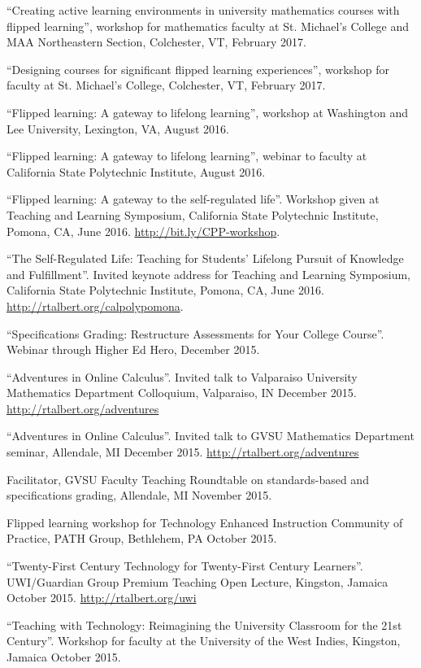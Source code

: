 \documentclass[letterpaper]{article}
\renewenvironment{itemize}{
  \begin{list}{}{
    \setlength{\leftmargin}{1.5em}
	\setlength{\itemsep}{0in}
  }
}{
  \end{list}
}
\begin{document}
\begin{itemize}
  \item ``Creating active learning environments in university mathematics courses with flipped learning'', workshop for mathematics faculty at St. Michael's College and MAA Northeastern Section, Colchester, VT, February 2017.
  \item ``Designing courses for significant flipped learning experiences'', workshop for faculty at St. Michael's College, Colchester, VT, February 2017.
  	\item ``Flipped learning: A gateway to lifelong learning'', workshop at Washington and Lee University, Lexington, VA, August 2016.
	\item ``Flipped learning: A gateway to lifelong learning'', webinar to faculty at California State Polytechnic Institute, August 2016.
	\item ``Flipped learning: A gateway to the self-regulated life''. Workshop given at Teaching and Learning Symposium, California State Polytechnic Institute, Pomona, CA, June 2016. \url{http://bit.ly/CPP-workshop}.
	\item ``The Self-Regulated Life: Teaching for Students' Lifelong Pursuit of Knowledge and Fulfillment''. Invited keynote address for Teaching and Learning Symposium, California State Polytechnic Institute, Pomona, CA, June 2016. \url{http://rtalbert.org/calpolypomona}.
	\item ``Specifications Grading: Restructure Assessments for Your College Course''. Webinar through Higher Ed Hero, December 2015.
	\item ``Adventures in Online Calculus''. Invited talk to Valparaiso University Mathematics Department Colloquium, Valparaiso, IN December 2015. \url{http://rtalbert.org/adventures}
	\item ``Adventures in Online Calculus''. Invited talk to GVSU Mathematics Department seminar, Allendale, MI December 2015. \url{http://rtalbert.org/adventures}
	\item Facilitator, GVSU Faculty Teaching Roundtable on standards-based and specifications grading, Allendale, MI November 2015.
	\item Flipped learning workshop for Technology Enhanced Instruction Community of Practice, PATH Group, Bethlehem, PA October 2015.
	\item ``Twenty-First Century Technology for Twenty-First Century Learners''. UWI/Guardian Group Premium Teaching Open Lecture, Kingston, Jamaica October 2015. \url{http://rtalbert.org/uwi}
	\item ``Teaching with Technology: Reimagining the University Classroom for the 21st Century''. Workshop for faculty at the University of the West Indies, Kingston, Jamaica October 2015.

\end{itemize}
\end{document}
